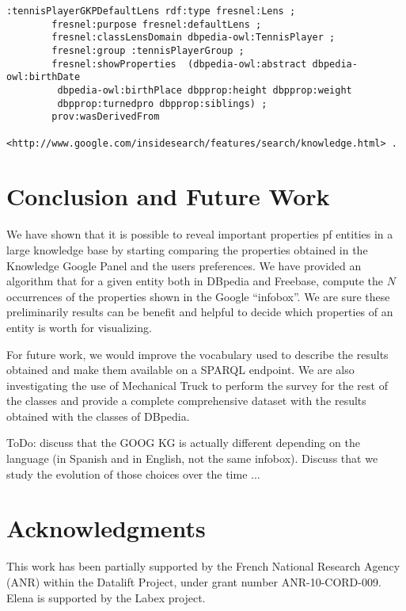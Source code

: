 \documentclass[runningheads,a4paper]{llncs}
\begin{document}
\begin{verbatim}
:tennisPlayerGKPDefaultLens rdf:type fresnel:Lens ;
		fresnel:purpose fresnel:defaultLens ;
		fresnel:classLensDomain dbpedia-owl:TennisPlayer ;
		fresnel:group :tennisPlayerGroup ;
		fresnel:showProperties  (dbpedia-owl:abstract dbpedia-owl:birthDate
		 dbpedia-owl:birthPlace dbpprop:height dbpprop:weight
		 dbpprop:turnedpro dbpprop:siblings) ;
		prov:wasDerivedFrom
		<http://www.google.com/insidesearch/features/search/knowledge.html> .		
\end{verbatim}	


\section{Conclusion and Future Work}
\label{sec:conclusion}
We have shown that it is possible to reveal important properties pf entities in a large knowledge base by starting comparing the properties obtained in the Knowledge Google Panel and the users preferences. We have provided an algorithm that for a given entity both in DBpedia and Freebase, compute the $N$ occurrences of the properties shown in the Google ``infobox''. We are sure these preliminarily results can be benefit and helpful to decide which properties of an entity is worth for visualizing.

For future work, we would improve the vocabulary used to describe the results obtained and make them available on a SPARQL endpoint. We are also investigating the use of Mechanical Truck to perform the survey for the rest of the classes and provide a complete comprehensive dataset with the results obtained with the classes of DBpedia.

ToDo: discuss that the GOOG KG is actually different depending on the language (in Spanish and in English, not the same infobox). Discuss that we study the evolution of those choices over the time ...


\section*{Acknowledgments} \label{sec:acknowledgments}
This work has been partially supported by the French National Research Agency (ANR) within the Datalift Project, under grant number ANR-10-CORD-009. Elena is supported by the Labex project.



\nocite{*}

\end{document}
